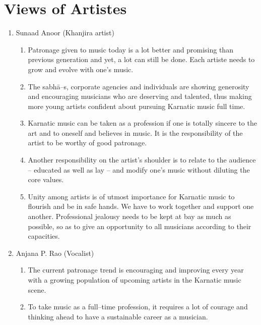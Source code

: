 \section*{Views of Artistes}

\begin{enumerate}
\itemsep=0pt
\item Sunaad Anoor (Khanjira artist)
 
\begin{enumerate}
\itemsep=0pt
\item Patronage given to music today is a lot better and promising than previous generation and yet, a lot can still be done. Each artiste needs to grow and evolve with one’s music.

 \item The sabhā–s, corporate agencies and individuals are showing generosity and encouraging musicians who are deserving and talented, thus making more young artists confident about pursuing Karnatic music full time.

 \item Karnatic music can be taken as a profession if one is totally sincere to the art and to oneself and believes in music. It is the responsibility of the artist to be worthy of good patronage.

 \item Another responsibility on the artist’s shoulder is to relate to the audience – educated as well as lay – and modify one’s music without diluting the core values.

 \item Unity among artists is of utmost importance for Karnatic music to flourish and be in safe hands. We have to work together and support one another. Professional jealousy needs to be kept at bay as much as possible, so as to give an opportunity to all musicians according to their capacities.
\end{enumerate}

 \item Anjana P. Rao (Vocalist)
 
\begin{enumerate}
\itemsep=0pt
\item The current patronage trend is encouraging and improving every year with a growing population of upcoming artists in the Karnatic music scene.

 \item To take music as a full–time profession, it requires a lot of courage and thinking ahead to have a sustainable career as a musician.


\end{enumerate}
\end{enumerate}
